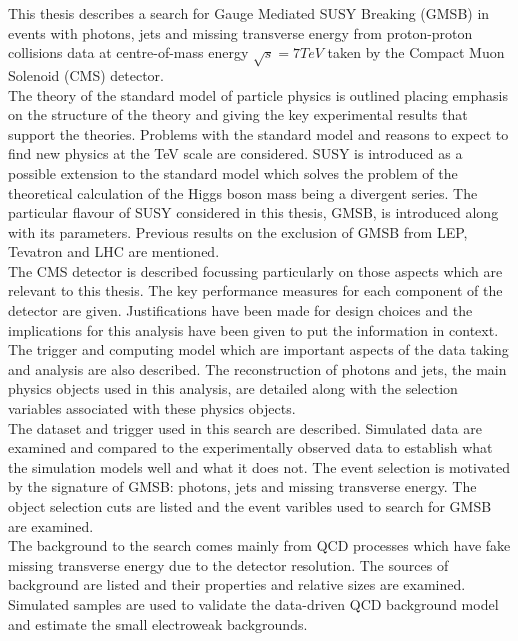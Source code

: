 This thesis describes a search for Gauge Mediated SUSY Breaking (GMSB) in
events with photons, jets and missing transverse energy from proton-proton
collisions data at centre-of-mass energy $\sqrt{s}=7\unit{TeV}$ taken by the
Compact Muon Solenoid (CMS) detector. \\

The theory of the standard model of particle physics is outlined placing
emphasis on the structure of the theory and giving the key experimental results
that support the theories. Problems with the standard model and reasons to 
expect to find new physics at the TeV scale are considered. SUSY is introduced 
as a possible extension to the standard model which solves the problem of the 
theoretical calculation of the Higgs boson mass being a divergent series. The 
particular flavour of SUSY considered in this thesis, GMSB, is introduced along 
with its parameters. Previous results on the exclusion of GMSB from LEP, 
Tevatron and LHC are mentioned. \\

The CMS detector is described focussing particularly on those aspects which are
relevant to this thesis. The key performance measures for each component of the
detector are given. Justifications have been made for design choices and the 
implications for this analysis have been given to put the information in 
context. The trigger and computing model which are important aspects of the data
taking and analysis are also described. The reconstruction of photons and jets,
the main physics objects used in this analysis, are detailed along with the
selection variables associated with these physics objects. \\

The dataset and trigger used in this search are described. Simulated 
data are examined and compared to the experimentally observed data to establish 
what the simulation models well and what it does not. The event selection is 
motivated by the signature of GMSB: photons, jets and missing transverse energy. 
The object selection cuts are listed and the event varibles used to search for 
GMSB are examined. \\

The background to the search comes mainly from QCD processes which have fake
missing transverse energy due to the detector resolution. The sources of 
background are listed and their properties and relative sizes are examined.
Simulated samples are used to validate the data-driven QCD background model and
estimate the small electroweak backgrounds. \\

